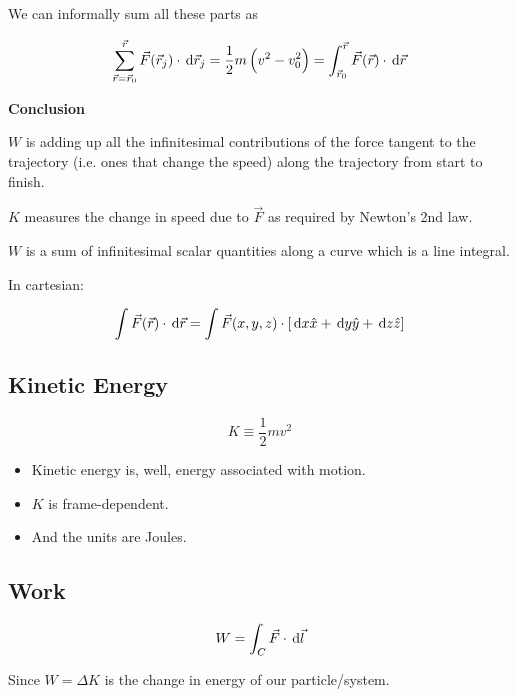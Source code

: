 We can informally sum all these parts as

\begin{equation}
	\sum_{\vec r = \vec r_0}^{\vec r} \vec F(\vec r_j) \cdot \D \vec r_j = \frac{1}{2} m \left(v^2 - v_0^2\right) = \int_{\vec r_0}^{\vec r} \vec F(\vec r) \cdot \D \vec r
\end{equation}

\textbf{Conclusion}

$W$ is adding up all the infinitesimal contributions of the force tangent to the trajectory (i.e. ones that change the speed) along the trajectory from start to finish.

$K$ measures the change in speed due to $\vec F$ as required by Newton's 2nd law.

$W$ is a sum of infinitesimal scalar quantities along a curve which is a line integral.

In cartesian:

\begin{equation}
	\int \vec F(\vec r) \cdot \D \vec r = \int \vec F(x, y, z) \cdot \left[\D x \hat x + \D y \hat y + \D z \hat z\right]
\end{equation}

\subsection{Kinetic Energy}

\begin{equation}
	K \equiv \frac{1}{2}mv^2
\end{equation}

\begin{itemize}
	\item Kinetic energy is, well, energy associated with motion.

	\item $K$ is frame-dependent.
	
	\item And the units are Joules.
\end{itemize}

\subsection{Work}

\begin{equation} \label{eq:work}
	W = \int_C \vec F \cdot \D \vec l
\end{equation}

Since $W = \Delta K$ is the change in energy of our particle/system.

